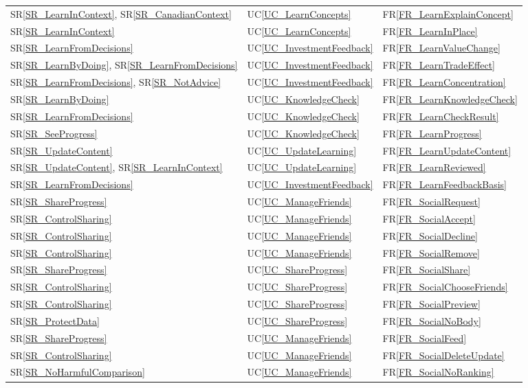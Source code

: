 \documentclass[12pt]{article}
\newcommand{\srref}[1]{SR\ref{#1}}
\newcommand{\ucref}[1]{UC\ref{#1}}
\newcommand{\rref}[1]{FR\ref{#1}}
\begin{document}
\begin{longtable}{p{} p{} p{}}
\srref{SR_LearnInContext}, \srref{SR_CanadianContext} & \ucref{UC_LearnConcepts} & \rref{FR_LearnExplainConcept} \\
\srref{SR_LearnInContext} & \ucref{UC_LearnConcepts} & \rref{FR_LearnInPlace} \\
\srref{SR_LearnFromDecisions} & \ucref{UC_InvestmentFeedback} & \rref{FR_LearnValueChange} \\
\srref{SR_LearnByDoing}, \srref{SR_LearnFromDecisions} & \ucref{UC_InvestmentFeedback} & \rref{FR_LearnTradeEffect} \\
\srref{SR_LearnFromDecisions}, \srref{SR_NotAdvice} & \ucref{UC_InvestmentFeedback} & \rref{FR_LearnConcentration} \\
\srref{SR_LearnByDoing} & \ucref{UC_KnowledgeCheck} & \rref{FR_LearnKnowledgeCheck} \\
\srref{SR_LearnFromDecisions} & \ucref{UC_KnowledgeCheck} & \rref{FR_LearnCheckResult} \\
\srref{SR_SeeProgress} & \ucref{UC_KnowledgeCheck} & \rref{FR_LearnProgress} \\
\srref{SR_UpdateContent} & \ucref{UC_UpdateLearning} & \rref{FR_LearnUpdateContent} \\
\srref{SR_UpdateContent}, \srref{SR_LearnInContext} & \ucref{UC_UpdateLearning} & \rref{FR_LearnReviewed} \\
\srref{SR_LearnFromDecisions} & \ucref{UC_InvestmentFeedback} & \rref{FR_LearnFeedbackBasis} \\

\srref{SR_ShareProgress} & \ucref{UC_ManageFriends} & \rref{FR_SocialRequest} \\
\srref{SR_ControlSharing} & \ucref{UC_ManageFriends} & \rref{FR_SocialAccept} \\
\srref{SR_ControlSharing} & \ucref{UC_ManageFriends} & \rref{FR_SocialDecline} \\
\srref{SR_ControlSharing} & \ucref{UC_ManageFriends} & \rref{FR_SocialRemove} \\
\srref{SR_ShareProgress} & \ucref{UC_ShareProgress} & \rref{FR_SocialShare} \\
\srref{SR_ControlSharing} & \ucref{UC_ShareProgress} & \rref{FR_SocialChooseFriends} \\
\srref{SR_ControlSharing} & \ucref{UC_ShareProgress} & \rref{FR_SocialPreview} \\
\srref{SR_ProtectData} & \ucref{UC_ShareProgress} & \rref{FR_SocialNoBody} \\
\srref{SR_ShareProgress} & \ucref{UC_ManageFriends} & \rref{FR_SocialFeed} \\
\srref{SR_ControlSharing} & \ucref{UC_ManageFriends} & \rref{FR_SocialDeleteUpdate} \\
\srref{SR_NoHarmfulComparison} & \ucref{UC_ManageFriends} & \rref{FR_SocialNoRanking} \\



\end{longtable}
\end{document}
